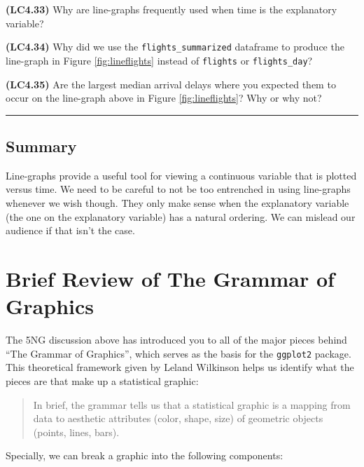 \documentclass[]{tufte-book}
\let\oldrule=\rule
\renewcommand{\rule}[1]{\oldrule{\linewidth}}
\begin{document}
\textbf{(LC4.33)} Why are line-graphs frequently used when time is the
explanatory variable?

\textbf{(LC4.34)} Why did we use the \texttt{flights\_summarized}
dataframe to produce the line-graph in Figure \ref{fig:lineflights}
instead of \texttt{flights} or \texttt{flights\_day}?

\textbf{(LC4.35)} Are the largest median arrival delays where you
expected them to occur on the line-graph above in Figure
\ref{fig:lineflights}? Why or why not?

\begin{center}\rule{0.5\linewidth}{\linethickness}\end{center}

\subsection{Summary}\label{summary-4}

Line-graphs provide a useful tool for viewing a continuous variable that
is plotted versus time. We need to be careful to not be too entrenched
in using line-graphs whenever we wish though. They only make sense when
the explanatory variable (the one on the explanatory variable) has a
natural ordering. We can mislead our audience if that isn't the case.

\section{Brief Review of The Grammar of
Graphics}\label{brief-review-of-the-grammar-of-graphics}

The 5NG discussion above has introduced you to all of the major pieces
behind ``The Grammar of Graphics'', which serves as the basis for the
\texttt{ggplot2} package. This theoretical framework given by Leland
Wilkinson \citep{wilkinson2005} helps us identify what the pieces are
that make up a statistical graphic:

\begin{quote}
In brief, the grammar tells us that a statistical graphic is a mapping
from data to aesthetic attributes (color, shape, size) of geometric
objects (points, lines, bars).
\end{quote}

Specially, we can break a graphic into the following components:
\end{document}
